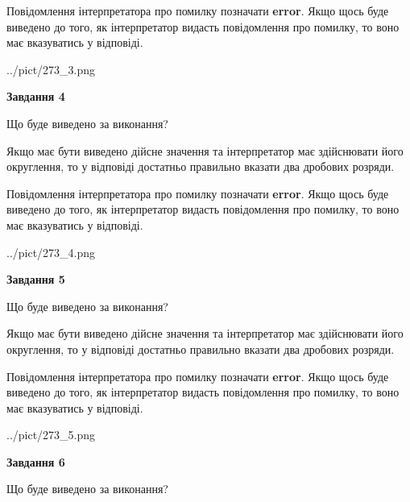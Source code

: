 \documentclass[12pt, ukrainian]{article}
\begin{document}
{\begin {Large}
Повідомлення інтерпретатора про помилку позначати \textbf{error}.
Якщо щось буде виведено до того, як інтерпретатор видасть повідомлення про помилку, 
то воно має вказуватись у відповіді. \par

\begin{center}
	{../pict/273_3.png}
\end{center}
\newpage

{\begin {center}\textbf{Завдання 4}\end {center}}\par
Що буде виведено за виконання? \par

Якщо має бути виведено дійсне значення та інтерпретатор має здійснювати його округлення, 
то у відповіді достатньо правильно вказати два дробових розряди.

Повідомлення інтерпретатора про помилку позначати \textbf{error}.
Якщо щось буде виведено до того, як інтерпретатор видасть повідомлення про помилку, 
то воно має вказуватись у відповіді. \par

\begin{center}
	{../pict/273_4.png}
\end{center}
\newpage

{\begin {center}\textbf{Завдання 5}\end {center}}\par
Що буде виведено за виконання? \par

Якщо має бути виведено дійсне значення та інтерпретатор має здійснювати його округлення, 
то у відповіді достатньо правильно вказати два дробових розряди.

Повідомлення інтерпретатора про помилку позначати \textbf{error}.
Якщо щось буде виведено до того, як інтерпретатор видасть повідомлення про помилку, 
то воно має вказуватись у відповіді. \par

\begin{center}
	{../pict/273_5.png}
\end{center}
\newpage

{\begin {center}\textbf{Завдання 6}\end {center}}\par
Що буде виведено за виконання? \par


\end{Large}}
\end{document}
